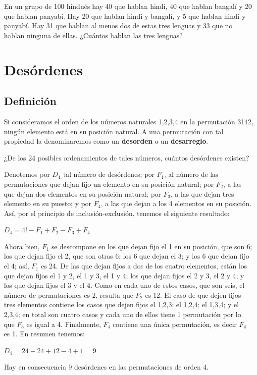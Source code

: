\documentclass[12pt]{article}
\begin{document}
\begin{ejercicio}
    En un grupo de 100 hindués hay 40 que hablan hindi, 40 que hablan bangalí y 20 que hablan panyabí. Hay 20 que hablan hindi y bangalí, y 5 que hablan hindi y panyabí. Hay 31 que hablan al menos dos de estas tres lenguas y 33 que no hablan ninguna de ellas. ¿Cuántos hablan las tres lenguas?
\end{ejercicio}

\section{Desórdenes}

\subsection{Definición}

Si consideramos el orden de los números naturales 1,2,3,4 en la permutación 3142, ningún elemento está en su posición natural. A una permutación con tal propiedad la denominaremos como un \textbf{desorden} o un \textbf{desarreglo}. 

\begin{problema}
    ¿De los 24 posibles ordenamientos de tales números, cuántos desórdenes existen?
\end{problema}

\begin{solucion}
    Denotemos por $D_4$ tal número de desórdenes; por $F_1$, al número de las permutaciones que dejan fijo un elemento en su posición natural; por $F_2$, a las que dejan dos elementos en su posición natural; por $F_3$, a las que dejan tres elemento en su puesto; y por $F_4$, a las que dejan a los 4 elementos en su posición. Así, por el principio de inclusión-exclusión, tenemos el siguiente resultado:

    \begin{center}
        $D_4= 4!-F_1+F_2-F_3+F_4$
    \end{center}

    Ahora bien, $F_1$ se descompone en los que dejan fijo el 1 en su posición, que son 6; los que dejan fijo el 2, que son otras 6; los 6 que dejan el 3; y los 6 que dejan fijo el 4; así, $F_1$ es 24. De las que dejan fijos a dos de los cuatro elementos, están los que dejan fijos el 1 y 2, el 1 y 3, el 1 y 4; los que dejan fijos el 2 y 3, el 2 y 4; y los que dejan fijos el 3 y el 4. Como en cada uno de estos casos, que son seis, el número de permutaciones es 2, resulta que $F_2$ es 12. El caso de que dejen fijos tres elementos contiene los casos  que dejen fijos el 1,2,3; el 1,2,4; el 1,3,4; y el 2,3,4; en total son cuatro casos y cada uno de ellos tiene 1 permutación por lo que $F_3$ es igual a 4. Finalmente, $F_4$ contiene una única permutación, es decir $F_4$ es 1. En resumen tenemos:

    \begin{center}
        $D_4= 24 - 24 + 12 - 4 + 1 = 9$
    \end{center}

    Hay en consecuencia 9 desórdenes en las permutaciones de orden 4.
\end{solucion}
\end{document}
